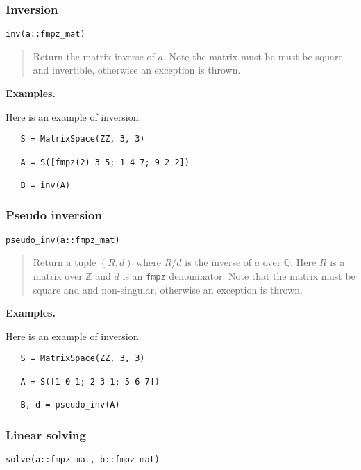 \documentclass[a4paper,10pt]{article}
\newcommand{\Z}{\mathbb{Z}}
\newcommand{\Q}{\mathbb{Q}}
\newcommand{\code}{\lstinline}
\newcommand{\desc}[1]{\vspace{-3mm}\begin{quote}#1\end{quote}}
\begin{document}
{{\subsubsection{Inversion}

\begin{lstlisting}
inv(a::fmpz_mat)
\end{lstlisting}

\desc{Return the matrix inverse of $a$. Note the matrix must be must be square and
invertible, otherwise an exception is thrown.}

\textbf{Examples.}

Here is an example of inversion.

\begin{lstlisting}
   S = MatrixSpace(ZZ, 3, 3)

   A = S([fmpz(2) 3 5; 1 4 7; 9 2 2])
  
   B = inv(A)
\end{lstlisting}

\subsubsection{Pseudo inversion}

\begin{lstlisting}
pseudo_inv(a::fmpz_mat)
\end{lstlisting}

\desc{Return a tuple $(R, d)$ where $R/d$ is the inverse of $a$ over $\Q$.
Here $R$ is a matrix over $\Z$ and $d$ is an \code{fmpz} denominator.
Note that the matrix must be square and and non-singular, otherwise an exception is thrown.}

\textbf{Examples.}

Here is an example of inversion.

\begin{lstlisting}
   S = MatrixSpace(ZZ, 3, 3)

   A = S([1 0 1; 2 3 1; 5 6 7])
  
   B, d = pseudo_inv(A)
\end{lstlisting}

\subsubsection{Linear solving}

\begin{lstlisting}
solve(a::fmpz_mat, b::fmpz_mat)
\end{lstlisting}

}}
\end{document}
